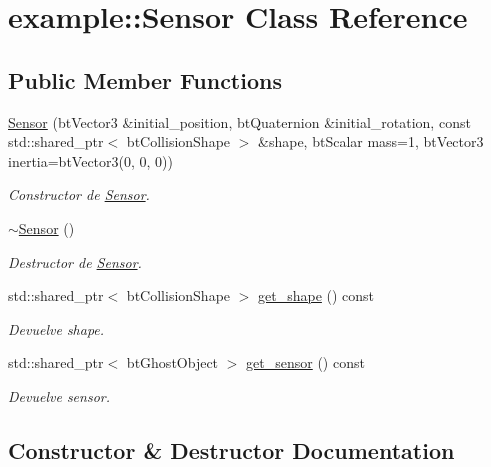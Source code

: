 \hypertarget{classexample_1_1_sensor}{}\section{example\+::Sensor Class Reference}
\label{classexample_1_1_sensor}
\subsection*{Public Member Functions}
\begin{DoxyCompactItemize}
\item 
\mbox{\hyperlink{classexample_1_1_sensor_a6d6ee34be3492fcad90b0d3acf6e80f9}{Sensor}} (bt\+Vector3 \&initial\+\_\+position, bt\+Quaternion \&initial\+\_\+rotation, const std\+::shared\+\_\+ptr$<$ bt\+Collision\+Shape $>$ \&shape, bt\+Scalar mass=1, bt\+Vector3 inertia=bt\+Vector3(0, 0, 0))
\begin{DoxyCompactList}\small\item\em Constructor de \mbox{\hyperlink{classexample_1_1_sensor}{Sensor}}. \end{DoxyCompactList}\item 
\mbox{\hyperlink{classexample_1_1_sensor_a80187e6c70bbc27a94898c969da87821}{$\sim$\+Sensor}} ()
\begin{DoxyCompactList}\small\item\em Destructor de \mbox{\hyperlink{classexample_1_1_sensor}{Sensor}}. \end{DoxyCompactList}\item 
std\+::shared\+\_\+ptr$<$ bt\+Collision\+Shape $>$ \mbox{\hyperlink{classexample_1_1_sensor_a80e5f857d87c6d7bb02d846924d95165}{get\+\_\+shape}} () const
\begin{DoxyCompactList}\small\item\em Devuelve shape. \end{DoxyCompactList}\item 
std\+::shared\+\_\+ptr$<$ bt\+Ghost\+Object $>$ \mbox{\hyperlink{classexample_1_1_sensor_a353a4257f339fc06ca91e57f521f028c}{get\+\_\+sensor}} () const
\begin{DoxyCompactList}\small\item\em Devuelve sensor. \end{DoxyCompactList}\end{DoxyCompactItemize}


\subsection{Constructor \& Destructor Documentation}
\mbox{\label{classexample_1_1_sensor_a6d6ee34be3492fcad90b0d3acf6e80f9}} 
